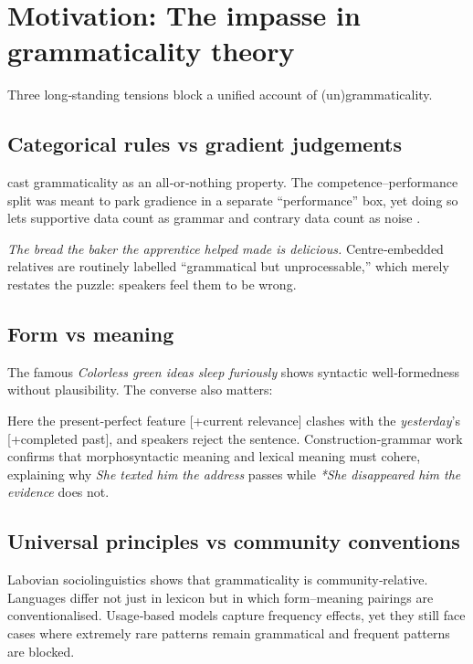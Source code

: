 \documentclass[12pt]{article}
\begin{document}
\section{Motivation: The impasse in grammaticality theory}

Three long‑standing tensions block a unified account of (un)grammaticality.

\subsection{Categorical rules vs gradient judgements}

\textcite{chomsky1957} cast grammaticality as an all‑or‑nothing property.  
The competence–performance split was meant to park gradience in a separate \enquote{performance} box, yet doing so lets supportive data count as grammar and contrary data count as noise \parencite[71]{schutze2016}.

\ea
\textit{The bread the baker the apprentice helped made is delicious.}
\z
Centre‑embedded relatives are routinely labelled \enquote{grammatical but unprocessable,} which merely restates the puzzle: speakers feel them to be wrong.

\subsection{Form vs meaning}

The famous \textit{Colorless green ideas sleep furiously} shows syntactic well‑formedness without plausibility.  The converse also matters:

\z
Here the present‑perfect feature [+current relevance] clashes with the \textit{yesterday}'s [+completed past], and speakers reject the sentence.  Construction‑grammar work \parencite{goldberg1995constructions} confirms that morphosyntactic meaning and lexical meaning must cohere, explaining why \textit{She texted him the address} passes while \textit{*She disappeared him the evidence} does not.

\subsection{Universal principles vs community conventions}

Labovian sociolinguistics \parencite{labov1972} shows that grammaticality is community‑relative.  Languages differ not just in lexicon but in which form–meaning pairings are conventionalised.  Usage‑based models capture frequency effects, yet they still face cases where extremely rare patterns remain grammatical and frequent patterns are blocked.
\end{document}

